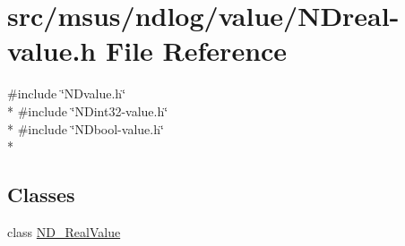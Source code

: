 \hypertarget{_n_dreal-value_8h}{\section{src/msus/ndlog/value/\-N\-Dreal-\/value.h File Reference}
\label{_n_dreal-value_8h}
}
{\ttfamily \#include \char`\"{}N\-Dvalue.\-h\char`\"{}}\\*
{\ttfamily \#include \char`\"{}N\-Dint32-\/value.\-h\char`\"{}}\\*
{\ttfamily \#include \char`\"{}N\-Dbool-\/value.\-h\char`\"{}}\\*
\subsection*{Classes}
\begin{DoxyCompactItemize}
\item 
class \hyperlink{class_n_d___real_value}{N\-D\-\_\-\-Real\-Value}
\end{DoxyCompactItemize}
